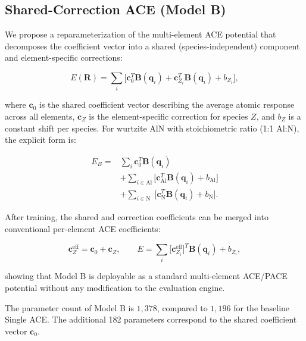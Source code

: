 \documentclass[twoside,prb,aps,floatfix,superscriptaddress,longbibliography]{revtex4-2}
\begin{document}
\subsection{Shared-Correction ACE (Model B)}
\label{sec:model_b}

We propose a reparameterization of the multi-element ACE potential that decomposes the coefficient vector into a shared (species-independent) component and element-specific corrections:

\begin{equation}
E(\mathbf{R}) = \sum_i \Big[ \mathbf{c}_0^T \mathbf{B}(\mathbf{q}_i) + \mathbf{c}_{Z_i}^T \mathbf{B}(\mathbf{q}_i) + b_{Z_i} \Big],
\label{eq:model_b}
\end{equation}

where $\mathbf{c}_0$ is the shared coefficient vector describing the average atomic response across all elements, $\mathbf{c}_Z$ is the element-specific correction for species $Z$, and $b_Z$ is a constant shift per species. For wurtzite AlN with stoichiometric ratio (1:1 Al:N), the explicit form is:

\begin{equation}
\begin{aligned}
E_B = &\sum_i \mathbf{c}_0^T \mathbf{B}(\mathbf{q}_i) \\
      &+ \sum_{i \in \mathrm{Al}} \big[ \mathbf{c}_{\mathrm{Al}}^T \mathbf{B}(\mathbf{q}_i) + b_{\mathrm{Al}} \big] \\
      &+ \sum_{i \in \mathrm{N}} \; \big[ \mathbf{c}_{\mathrm{N}}^T \mathbf{B}(\mathbf{q}_i) + b_{\mathrm{N}} \big].
\end{aligned}
\label{eq:model_b_explicit}
\end{equation}

After training, the shared and correction coefficients can be merged into conventional per-element ACE coefficients:

\begin{equation}
\mathbf{c}_Z^{\mathrm{eff}} = \mathbf{c}_0 + \mathbf{c}_Z,
\qquad
E = \sum_i \big[ \mathbf{c}_{Z_i}^{\mathrm{eff}} \big]^T \mathbf{B}(\mathbf{q}_i) + b_{Z_i},
\label{eq:merge}
\end{equation}

showing that Model B is deployable as a standard multi-element ACE/PACE potential without any modification to the evaluation engine.

The parameter count of Model B is $1{,}378$, compared to $1{,}196$ for the baseline Single ACE. The additional 182 parameters correspond to the shared coefficient vector $\mathbf{c}_0$.
\end{document}
